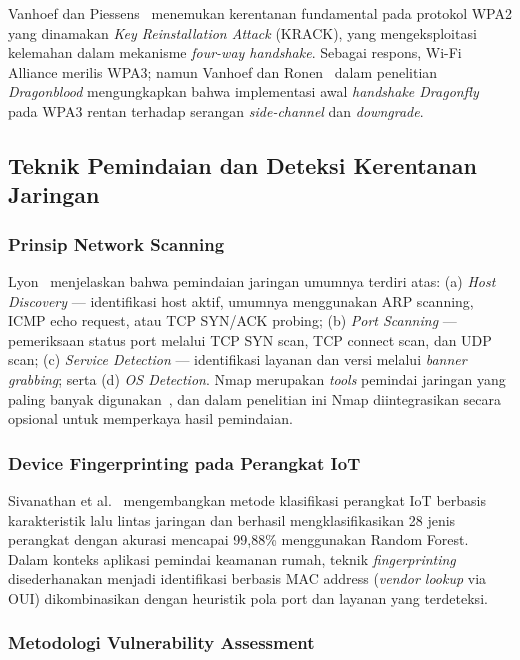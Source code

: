 \documentclass[conference]{IEEEtran}
\begin{document}
Vanhoef dan Piessens\ \cite{vanhoef2017} menemukan kerentanan fundamental pada protokol WPA2 yang dinamakan \textit{Key Reinstallation Attack} (KRACK), yang mengeksploitasi kelemahan dalam mekanisme \textit{four-way handshake}. Sebagai respons, Wi-Fi Alliance merilis WPA3; namun Vanhoef dan Ronen\ \cite{vanhoef2020} dalam penelitian \textit{Dragonblood} mengungkapkan bahwa implementasi awal \textit{handshake Dragonfly} pada WPA3 rentan terhadap serangan \textit{side-channel} dan \textit{downgrade}.

\subsection{Teknik Pemindaian dan Deteksi Kerentanan Jaringan}

\subsubsection{Prinsip Network Scanning}

Lyon\ \cite{lyon2009} menjelaskan bahwa pemindaian jaringan umumnya terdiri atas: (a) \textit{Host Discovery} --- identifikasi host aktif, umumnya menggunakan ARP scanning, ICMP echo request, atau TCP SYN/ACK probing; (b) \textit{Port Scanning} --- pemeriksaan status port melalui TCP SYN scan, TCP connect scan, dan UDP scan; (c) \textit{Service Detection} --- identifikasi layanan dan versi melalui \textit{banner grabbing}; serta (d) \textit{OS Detection}. Nmap merupakan \textit{tools} pemindai jaringan yang paling banyak digunakan\ \cite{lyon2009}, dan dalam penelitian ini Nmap diintegrasikan secara opsional untuk memperkaya hasil pemindaian.

\subsubsection{Device Fingerprinting pada Perangkat IoT}

Sivanathan et al.\ \cite{sivanathan2019} mengembangkan metode klasifikasi perangkat IoT berbasis karakteristik lalu lintas jaringan dan berhasil mengklasifikasikan 28 jenis perangkat dengan akurasi mencapai 99,88\% menggunakan Random Forest. Dalam konteks aplikasi pemindai keamanan rumah, teknik \textit{fingerprinting} disederhanakan menjadi identifikasi berbasis MAC address (\textit{vendor lookup} via OUI) dikombinasikan dengan heuristik pola port dan layanan yang terdeteksi.

\subsubsection{Metodologi Vulnerability Assessment}
\end{document}
